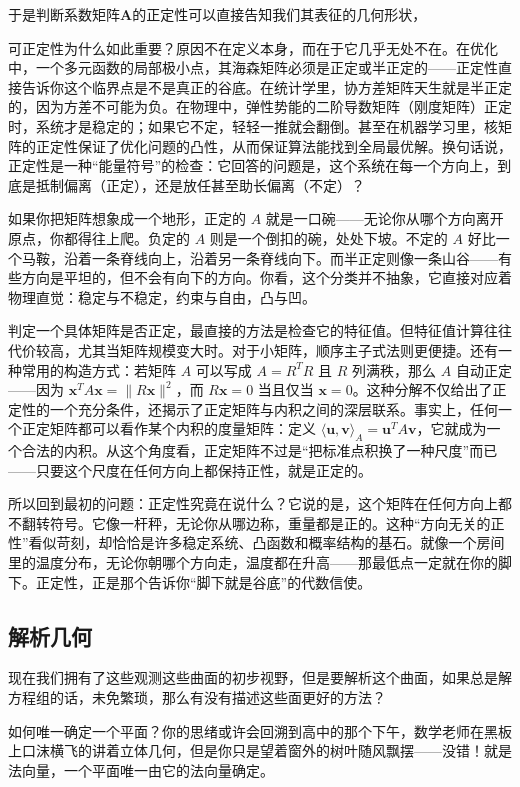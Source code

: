 \documentclass[UTF8]{ctexbook}
\begin{document}
于是判断系数矩阵$\mathbf{A}$的正定性可以直接告知我们其表征的几何形状，

可正定性为什么如此重要？原因不在定义本身，而在于它几乎无处不在。在优化中，一个多元函数的局部极小点，其海森矩阵必须是正定或半正定的——正定性直接告诉你这个临界点是不是真正的谷底。在统计学里，协方差矩阵天生就是半正定的，因为方差不可能为负。在物理中，弹性势能的二阶导数矩阵（刚度矩阵）正定时，系统才是稳定的；如果它不定，轻轻一推就会翻倒。甚至在机器学习里，核矩阵的正定性保证了优化问题的凸性，从而保证算法能找到全局最优解。换句话说，正定性是一种“能量符号”的检查：它回答的问题是，这个系统在每一个方向上，到底是抵制偏离（正定），还是放任甚至助长偏离（不定）？

如果你把矩阵想象成一个地形，正定的 \(A\) 就是一口碗——无论你从哪个方向离开原点，你都得往上爬。负定的 \(A\) 则是一个倒扣的碗，处处下坡。不定的 \(A\) 好比一个马鞍，沿着一条脊线向上，沿着另一条脊线向下。而半正定则像一条山谷——有些方向是平坦的，但不会有向下的方向。你看，这个分类并不抽象，它直接对应着物理直觉：稳定与不稳定，约束与自由，凸与凹。

判定一个具体矩阵是否正定，最直接的方法是检查它的特征值。但特征值计算往往代价较高，尤其当矩阵规模变大时。对于小矩阵，顺序主子式法则更便捷。还有一种常用的构造方式：若矩阵 \(A\) 可以写成 \(A = R^T R\) 且 \(R\) 列满秩，那么 \(A\) 自动正定——因为 \(\mathbf{x}^T A\mathbf{x} = \|R\mathbf{x}\|^2\)，而 \(R\mathbf{x}=0\) 当且仅当 \(\mathbf{x}=0\)。这种分解不仅给出了正定性的一个充分条件，还揭示了正定矩阵与内积之间的深层联系。事实上，任何一个正定矩阵都可以看作某个内积的度量矩阵：定义 \(\langle \mathbf{u},\mathbf{v}\rangle_A = \mathbf{u}^T A \mathbf{v}\)，它就成为一个合法的内积。从这个角度看，正定矩阵不过是“把标准点积换了一种尺度”而已——只要这个尺度在任何方向上都保持正性，就是正定的。

所以回到最初的问题：正定性究竟在说什么？它说的是，这个矩阵在任何方向上都不翻转符号。它像一杆秤，无论你从哪边称，重量都是正的。这种“方向无关的正性”看似苛刻，却恰恰是许多稳定系统、凸函数和概率结构的基石。就像一个房间里的温度分布，无论你朝哪个方向走，温度都在升高——那最低点一定就在你的脚下。正定性，正是那个告诉你“脚下就是谷底”的代数信使。


\subsection{解析几何}

现在我们拥有了这些观测这些曲面的初步视野，但是要解析这个曲面，如果总是解方程组的话，未免繁琐，那么有没有描述这些面更好的方法？

如何唯一确定一个平面？你的思绪或许会回溯到高中的那个下午，数学老师在黑板上口沫横飞的讲着立体几何，但是你只是望着窗外的树叶随风飘摆——没错！就是法向量，一个平面唯一由它的法向量确定。
\end{document}
